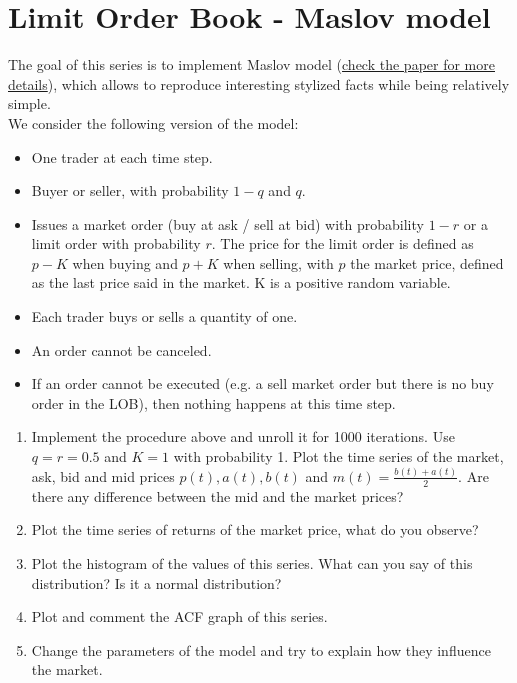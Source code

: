 \section*{Limit Order Book - Maslov model}

The goal of this series is to implement Maslov model (\href{https://arxiv.org/pdf/cond-mat/9910502.pdf}{check the paper for more details}), which allows to reproduce interesting stylized facts while being relatively simple. \\

\noindent We consider the following version of the model:

\begin{itemize}
    \item One trader at each time step.
    \item Buyer or seller, with probability $1 - q$ and $q$.
    \item Issues a market order (buy at ask / sell at bid) with probability $1 - r$ or a limit order with probability $r$. The price for the limit order is defined as $p - K$ when buying and $p + K$ when selling, with $p$ the market price, defined as the last price said in the market. K is a positive random variable.
    \item Each trader buys or sells a quantity of one.
    \item An order cannot be canceled.
    \item If an order cannot be executed (e.g. a sell market order but there is no buy order in the LOB), then nothing happens at this time step.
\end{itemize}

\begin{enumerate}
    \item Implement the procedure above and unroll it for 1000 iterations. Use $q = r = 0.5$ and $K = 1$ with probability 1. Plot the time series of the market, ask, bid and mid prices $p(t), a(t), b(t)$ and $ m(t) = \frac{b(t) + a(t)}{2}$. Are there any difference between the mid and the market prices? 
    \item Plot the time series of returns of the market price, what do you observe?
    \item Plot the histogram of the values of this series. What can you say of this distribution? Is it a normal distribution?
    \item Plot and comment the ACF graph of this series. 
    \item Change the parameters of the model and try to explain how they influence the market.
\end{enumerate}
